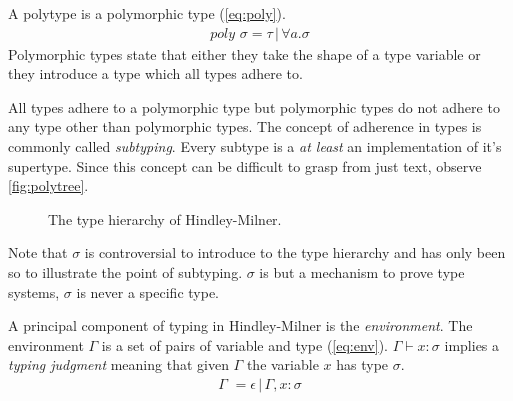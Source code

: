 \documentclass[11pt,oneside,a4paper]{report}
\begin{document}
A polytype is a polymorphic type (\autoref{eq:poly}).
\begin{align}
	poly \,\, \sigma = \tau \,|\, \forall a . \sigma
	\label{eq:poly}
\end{align}
Polymorphic types state that either they take the shape of a type variable or they introduce a type which all types adhere to. 
\begin{remark}
    All types adhere to a polymorphic type but polymorphic types do not adhere to any type other than polymorphic types.
    The concept of adherence in types is commonly called \textit{subtyping}.
    Every subtype is a \textit{at least} an implementation of it's supertype.
    Since this concept can be difficult to grasp from just text, observe \autoref{fig:polytree}.
    \begin{figure}[ht]
        \centering
        \caption{The type hierarchy of Hindley-Milner.}
        \label{fig:polytree}
    \end{figure}
    Note that $\sigma$ is controversial to introduce to the type hierarchy and has only been so to illustrate the point of subtyping.
    $\sigma$ is but a mechanism to prove type systems, $\sigma$ is never a specific type.

\end{remark}
A principal component of typing in Hindley-Milner is the \textit{environment}.
The environment $\Gamma$ is a set of pairs of variable and type (\autoref{eq:env}).
$\Gamma \vdash x: \sigma$ implies a \textit{typing judgment} meaning that given $\Gamma$ the variable $x$ has type $\sigma$.
\begin{align}
	\Gamma \,\, = \epsilon \,|\, \Gamma, x : \sigma
	\label{eq:env}
\end{align}
\end{document}
